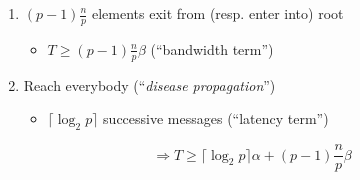 \documentclass[xcolor={rgb,x11names,svgnames},rgb,x11names,svgnames]{beamer}
\begin{document}
\begin{frame}
  \begin{alertblock}{\vspace*{-3ex}}
    \begin{enumerate}
    \item $(p-1) \frac{n}{p}$ elements exit from (resp. enter into) {\color{blue} root}
      \begin{itemize}
      \item $T \geq (p-1) \frac{n}{p} \beta$ \hfill (``bandwidth term'')
      \end{itemize}
    \item Reach everybody (``\emph{disease propagation}'')
      \begin{itemize}
      \item $\lceil \log_2 p \rceil$ successive messages \hfill (``latency term'')
      \end{itemize}
    \end{enumerate}
  \end{alertblock}
  
  \[
    \Longrightarrow T \geq \lceil \log_2 p \rceil \alpha + (p-1) \frac{n}{p} \beta
  \]
\end{frame}

\end{document}

